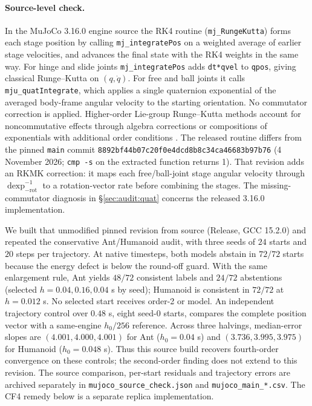 \documentclass[10pt]{article}
\theoremstyle{definition}
\begin{document}
\paragraph{Source-level check.} In the MuJoCo 3.16.0 engine source
\citep{todorov2012mujoco,mujocosrc} the RK4 routine (\texttt{mj\_RungeKutta})
forms each stage position by calling \texttt{mj\_integratePos} on a weighted
average of earlier stage velocities, and advances the final state with the
RK4 weights in the same way. For hinge and slide joints
\texttt{mj\_integratePos} adds \texttt{dt*qvel} to \texttt{qpos}, giving classical
Runge--Kutta on $(q,\dot q)$. For free and ball joints it calls
\texttt{mju\_quatIntegrate}, which applies a single quaternion exponential of
the averaged body-frame angular velocity to the starting orientation. No
commutator correction is applied. Higher-order Lie-group Runge--Kutta methods
account for noncommutative effects through algebra corrections or
compositions of exponentials with additional order conditions
\citep{crouch1993,munthekaas1998,celledoni2003}. The released routine differs from the pinned \texttt{main} commit
\texttt{8892bf44b07c20f0e4dcd8b8c34ca46683b97b76} (4 November 2026;
\texttt{cmp -s} on the extracted function returns 1). That revision adds an
RKMK correction: it maps each free/ball-joint stage angular velocity through
$\operatorname{dexp}^{-1}_{-\mathrm{rot}}$ to a rotation-vector rate before
combining the stages. The missing-commutator diagnosis in \S\ref{sec:audit:quat} concerns the
released 3.16.0 implementation.

We built that unmodified pinned revision from source (Release, GCC 15.2.0)
and repeated the conservative Ant/Humanoid audit, with three seeds of $24$
starts and $20$ steps per trajectory. At native timesteps, both models abstain
in $72/72$ starts because the energy defect is below the round-off guard.
With the same enlargement rule, Ant yields $48/72$ consistent labels and
$24/72$ abstentions (selected $h=0.04,0.16,0.04$ s by seed); Humanoid is
consistent in $72/72$ at $h=0.012$ s. No selected start receives order-2 or
model. An independent trajectory control over $0.48$ s, eight seed-0 starts,
compares the complete position vector with a same-engine $h_0/256$ reference.
Across three halvings, median-error slopes are $(4.001,4.000,4.001)$ for Ant
($h_0=0.04$ s) and $(3.736,3.995,3.975)$ for Humanoid ($h_0=0.048$ s).
Thus this source build recovers fourth-order convergence on these controls;
the second-order finding does not extend to this revision. The source comparison,
per-start residuals and trajectory errors are archived separately in
\texttt{mujoco\_source\_check.json} and \texttt{mujoco\_main\_*.csv}.
The CF4 remedy below is a separate replica implementation.
\end{document}
